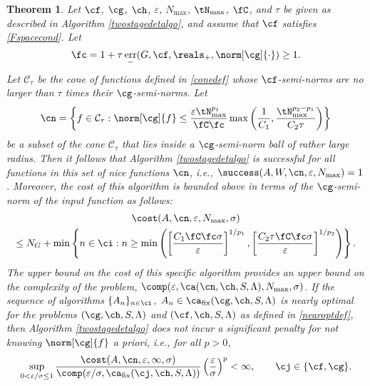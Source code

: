 \documentclass[final]{elsarticle}
\newcommand{\cc}{\mathcal{C}}
\DeclareMathOperator{\err}{err}
\newtheorem{theorem}{Theorem}
\theoremstyle{definition}
\theoremstyle{remark}
\DeclareMathOperator{\fix}{fix}
\begin{document}
\begin{theorem}  \label{TwoStageDetermThm}  Let  $\cf$, $\cg$, $\ch$, $\varepsilon$, $N_{\max}$, $\tN_{\max}$, $\fC$, and $\tau$ be given as described in Algorithm \ref{twostagedetalgo}, and assume that $\cf$ satisfies \eqref{Fspacecond}.  Let 
\begin{equation} \label{normdeflate}
\fc =1 + \tau \err_{-}(G,\cf,\reals_+,\norm[\cg]{\cdot})  \ge 1.
\end{equation}
Let $\cc_\tau$ be the cone of functions defined in \eqref{conedef} whose $\cf$-semi-norms are no larger than $\tau$ times their $\cg$-semi-norms.  Let
\begin{equation} \label{nicefdef}
\cn = \left \{ f \in \cc_\tau : \norm[\cg]{f} \le \frac{\varepsilon \tN_{\max}^{p_1}}{\fC \fc} \max\left( \frac{1}{C_1}, \frac{\tN_{\max}^{p_2-p_1}}{C_2 \tau} \right ) \right\}
\end{equation}
be a subset of the cone $\cc_\tau$ that lies inside a $\cg$-semi-norm ball of rather large radius.  Then it follows that Algorithm \ref{twostagedetalgo} is successful for all functions in this set of \emph{nice} functions $\cn$,  i.e.,  $\success(A,W,\cn,\varepsilon,N_{\max}) = 1$.  Moreover, the cost of this algorithm is bounded above in terms of the $\cg$-semi-norm of the input function as follows:
\begin{multline} \label{auto2stagedetcost}
\cost(A,\cn,\varepsilon,N_{\max},\sigma) \\
\le N_G+ \min\left\{ n \in \ci : n \ge \min\left( \left[\frac{C_1 \fC \fc \sigma }{\varepsilon}\right]^{1/p_1}, \left[\frac{C_2 \tau \fC \fc \sigma}{\varepsilon}\right]^{1/p_2} \right ) \right\}.
\end{multline}
The upper bound on the cost of this specific algorithm provides an upper bound on the complexity of the problem, $\comp(\varepsilon,\ca(\cn,\ch,S,\Lambda),N_{\max},\sigma)$.  If the sequence of algorithms $\{A_n\}_{n \in \ci}$, $A_n \in\ca_{\fix}(\cg,\ch,S,\Lambda)$  is nearly optimal for the problems $(\cg,\ch,S,\Lambda)$ and $(\cf,\ch,S,\Lambda)$ as defined in \eqref{nearoptdef}, then Algorithm \ref{twostagedetalgo} does not incur a significant penalty for not knowing $\norm[\cg]{f}$ a priori, i.e., for all $p>0$,
\begin{equation} \label{penalty}
\sup_{0 < \varepsilon/\sigma \le 1} \frac{\cost(A,\cn,\varepsilon,\infty,\sigma)} {\comp(\varepsilon/\sigma,\ca_{\fix}(\cj,\ch,S,\Lambda))} \left(\frac{\varepsilon}{\sigma}\right)^p <\infty, \qquad \cj \in \{\cf,\cg\}.
\end{equation}
\end{theorem}
\end{document}
